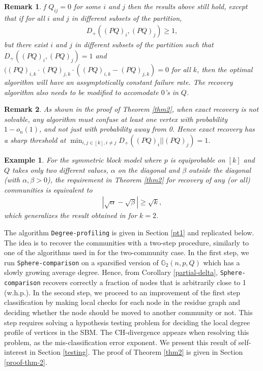 \documentclass[11pt]{article}
\newcommand{\gs}{\mathbb{G}_2}
\newcommand{\dd}{D_+}
\newcommand{\1}{\mathbb{1}}
\newtheorem{remark}{Remark}
\newtheorem{example}{Example}
\begin{document}
\begin{remark}\label{qzero}
f $Q_{ij}=0$ for some $i$ and $j$ then the results above still hold, except that if for all $i$ and $j$ in different subsets of the partition,
\begin{align}
\dd ((PQ)_i , (PQ)_j) \geq 1, \label{d1}
\end{align}
but there exist $i$ and $j$  in different subsets of the partition such that $\dd ((PQ)_i , (PQ)_j) = 1$ and $((PQ)_{i,k}\cdot (PQ)_{j,k}\cdot ((PQ)_{i,k}-(PQ)_{j,k})=0$ for all $k$, then the optimal algorithm will have an assymptotically constant failure rate. The recovery algorithm also needs to be modified to accomodate $0$'s in $Q$.
\end{remark}

\begin{remark}
As shown in the proof of Theorem \ref{thm2}, when exact recovery is not solvable, any algorithm must confuse at least one vertex with probability $1-o_n(1)$, and not just with probability away from 0. Hence exact recovery has a sharp threshold at $\min_{i,j \in [k], i \neq j} \dd ((PQ)_i || (PQ)_j) = 1$.
\end{remark}

\begin{example}
For the symmetric block model where $p$ is equiprobable on $[k]$ and $Q$ takes only two different values, $\alpha$ on the diagonal and $\beta$ outside the diagonal (with $\alpha,\beta>0$), the requirement in Theorem \ref{thm2} for recovery of any (or all) communities is equivalent to  
\begin{align}
|\sqrt{\alpha} - \sqrt{\beta}| \geq \sqrt{k},
\end{align}
which generalizes the result obtained in \cite{abh,mossel-consist} for $k=2$.  
\end{example}


The algorithm {\tt Degree-profiling} is given in Section \ref{pt1} and replicated below. The idea is to recover the communities with a two-step procedure, similarly to one of the algorithms used in \cite{abh} for the two-community case. In the first step, we run {\tt Sphere-comparison} on a sparsified version of $\gs(n,p,Q)$ which has a slowly growing average degree. Hence, from Corollary \ref{partial-delta}, {\tt Sphere-comparison} recovers correctly a fraction of nodes that is arbitrarily close to 1 (w.h.p.). In the second step, we proceed to an improvement of the first step classification by making local checks for each node in the residue graph and deciding whether the node should be moved to another community or not. This step requires solving a hypothesis testing problem for deciding the local degree profile of vertices in the SBM. The CH-divergence appears when resolving this problem, as the mis-classification error exponent. We present this result of self-interest in Section \ref{testing}. The proof of Theorem \ref{thm2} is given in Section \ref{proof-thm-2}. \\
\end{document}
